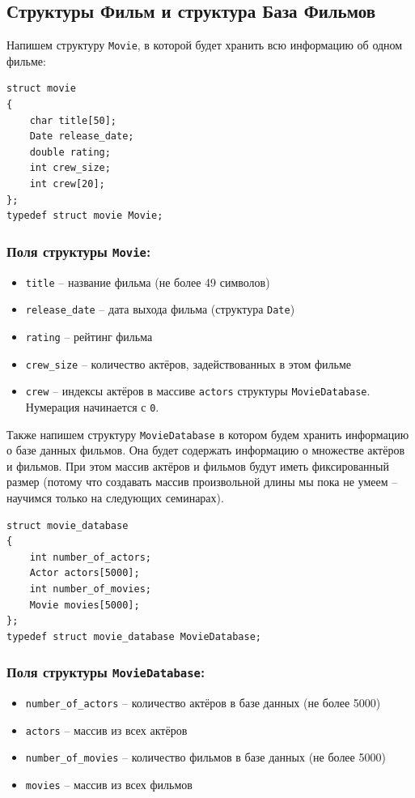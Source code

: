 \documentclass{article}
\begin{document}
\newpage
\subsection{Структуры Фильм  и структура База Фильмов}
Напишем структуру \texttt{Movie}, в которой будет хранить всю информацию об одном фильме:
\begin{lstlisting}
struct movie 
{
    char title[50];
    Date release_date;
    double rating;
    int crew_size;
    int crew[20];
};
typedef struct movie Movie;
\end{lstlisting}
\subsubsection*{Поля структуры \texttt{Movie}:}
\begin{itemize}
\item \texttt{title} -- название фильма (не более 49 символов)
\item \texttt{release\_date} -- дата выхода фильма (структура \texttt{Date})
\item \texttt{rating} -- рейтинг фильма
\item \texttt{crew\_size} -- количество актёров, задействованных в этом фильме
\item \texttt{crew} -- индексы актёров в массиве \texttt{actors} структуры \texttt{MovieDatabase}. Нумерация начинается с \texttt{0}.
\end{itemize}

Также напишем структуру \texttt{MovieDatabase} в котором будем хранить информацию о базе данных фильмов. Она будет содержать информацию о множестве актёров и фильмов. При этом массив актёров и фильмов будут иметь фиксированный размер (потому что создавать массив произвольной длины мы пока не умеем -- научимся только на следующих семинарах).
\begin{lstlisting}
struct movie_database 
{
    int number_of_actors;
    Actor actors[5000];
    int number_of_movies;
    Movie movies[5000]; 
};
typedef struct movie_database MovieDatabase;
\end{lstlisting}

\subsubsection*{Поля структуры \texttt{MovieDatabase}:}
\begin{itemize}
\item \texttt{number\_of\_actors} -- количество актёров в базе данных (не более 5000)
\item \texttt{actors} -- массив из всех актёров
\item \texttt{number\_of\_movies} -- количество фильмов в базе данных (не более 5000)
\item \texttt{movies} -- массив из всех фильмов
\end{itemize}
\end{document}
